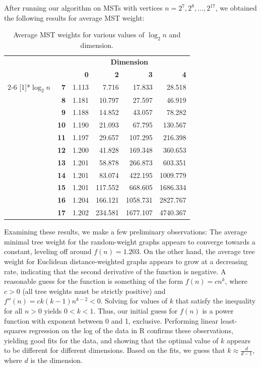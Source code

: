 \documentclass[a4paper]{article}
\begin{document}
\newpage
After running our algorithm on MSTs with vertices $n=2^7, 2^8, ..., 2^{17}$, we obtained the following results for average MST weight:

\begin{table}[htbp]
  \centering
    \begin{tabular}{cr|rrrr}
          & \multicolumn{1}{r}{} & \multicolumn{4}{c}{\textbf{Dimension}} \\
          &       & \textbf{0} & \textbf{2} & \textbf{3} & \textbf{4} \\
\cmidrule{2-6}    \multirow{11}[1]{*}{\textbf{$\log_2n$}} & \textbf{7} & 1.113 & 7.716 & 17.833 & 28.518 \\
          & \textbf{8} & 1.181 & 10.797 & 27.597 & 46.919 \\
          & \textbf{9} & 1.188 & 14.852 & 43.057 & 78.282 \\
          & \textbf{10} & 1.190 & 21.093 & 67.795 & 130.567 \\
          & \textbf{11} & 1.197 & 29.657 & 107.295 & 216.398 \\
          & \textbf{12} & 1.200 & 41.828 & 169.348 & 360.653 \\
          & \textbf{13} & 1.201 & 58.878 & 266.873 & 603.351 \\
          & \textbf{14} & 1.201 & 83.074 & 422.195 & 1009.779 \\
          & \textbf{15} & 1.201 & 117.552 & 668.605 & 1686.334 \\
          & \textbf{16} & 1.204 & 166.121 & 1058.731 & 2827.767 \\
          & \textbf{17} & 1.202 & 234.581 & 1677.107 & 4740.367 \\
    \end{tabular}%
  \caption{Average MST weights for various values of $\log_2n$ and dimension.}
  \label{tab:addlabel}%
\end{table}%

Examining these results, we make a few preliminary observations: The average minimal tree weight for the random-weight graphs appears to converge towards a constant, leveling off around $f(n) = 1.203$. On the other hand, the average tree weight for Euclidean distance-weighted graphs appears to grow at a decreasing rate, indicating that the second derivative of the function is negative. A reasonable guess for the function is something of the form $f(n) = cn^k$, where $c>0$ (all tree weights must be strictly positive) and $f''(n) = ck(k-1)n^{k-2} < 0$. Solving for values of $k$ that satisfy the inequality for all $n>0$ yields $0<k<1$. Thus, our initial guess for $f(n)$ is a power function with exponent between 0 and 1, exclusive. Performing linear least-squares regression on the log of the data in R confirms these observations, yielding good fits for the data, and showing that the optimal value of $k$ appears to be different for different dimensions. Based on the fits, we guess that $k\approx \frac{d}{d-1}$, where $d$ is the dimension.
\end{document}
